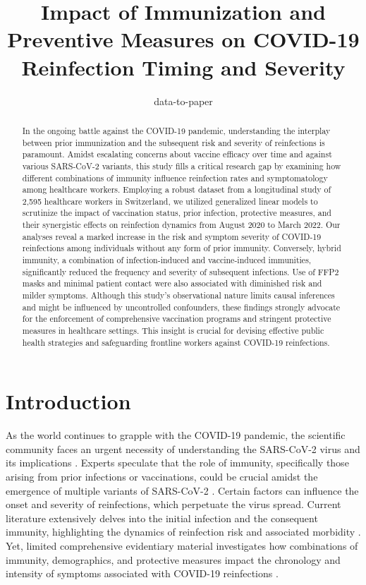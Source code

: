 \documentclass[11pt]{article}
\title{Impact of Immunization and Preventive Measures on COVID-19 Reinfection Timing and Severity}
\author{data-to-paper}
\begin{document}
\maketitle
\begin{abstract}
In the ongoing battle against the COVID-19 pandemic, understanding the interplay between prior immunization and the subsequent risk and severity of reinfections is paramount. Amidst escalating concerns about vaccine efficacy over time and against various SARS-CoV-2 variants, this study fills a critical research gap by examining how different combinations of immunity influence reinfection rates and symptomatology among healthcare workers. Employing a robust dataset from a longitudinal study of 2,595 healthcare workers in Switzerland, we utilized generalized linear models to scrutinize the impact of vaccination status, prior infection, protective measures, and their synergistic effects on reinfection dynamics from August 2020 to March 2022. Our analyses reveal a marked increase in the risk and symptom severity of COVID-19 reinfections among individuals without any form of prior immunity. Conversely, hybrid immunity, a combination of infection-induced and vaccine-induced immunities, significantly reduced the frequency and severity of subsequent infections. Use of FFP2 masks and minimal patient contact were also associated with diminished risk and milder symptoms. Although this study’s observational nature limits causal inferences and might be influenced by uncontrolled confounders, these findings strongly advocate for the enforcement of comprehensive vaccination programs and stringent protective measures in healthcare settings. This insight is crucial for devising effective public health strategies and safeguarding frontline workers against COVID-19 reinfections.
\end{abstract}
\section*{Introduction}

As the world continues to grapple with the COVID-19 pandemic, the scientific community faces an urgent necessity of understanding the SARS-CoV-2 virus and its implications \cite{Pulliam2022IncreasedRO}. Experts speculate that the role of immunity, specifically those arising from prior infections or vaccinations, could be crucial amidst the emergence of multiple variants of SARS-CoV-2 \cite{Mensah2022DiseaseSD, Dan2021ImmunologicalMT}. Certain factors can influence the onset and severity of reinfections, which perpetuate the virus spread. Current literature extensively delves into the initial infection and the consequent immunity, highlighting the dynamics of reinfection risk and associated morbidity \cite{Ren2022ReinfectionIP, Cromer2021ProspectsFD}. Yet, limited comprehensive evidentiary material investigates how combinations of immunity, demographics, and protective measures impact the chronology and intensity of symptoms associated with COVID-19 reinfections \cite{Wang2021COVID19RA}.
\end{document}
